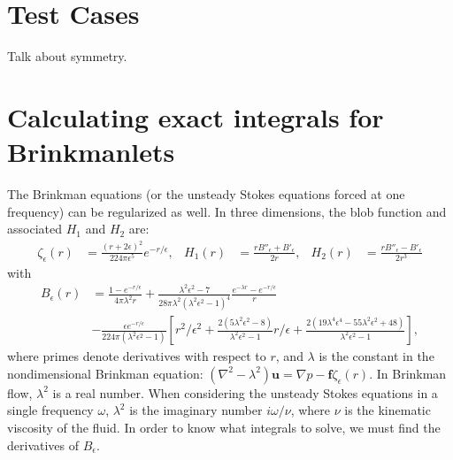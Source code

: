\documentclass[12pt]{article}
\newcommand{\bu}{\mathbf{u}}
\newcommand{\ff}{\mathbf{f}}
\newcommand{\eps}{\epsilon}
\newcommand{\baas}[1]{\begin{align*} #1 \end{align*}}
\begin{document}
	\section{Test Cases} 
	Talk about symmetry.


	\section{Calculating exact integrals for Brinkmanlets}

	The Brinkman equations (or the unsteady Stokes equations forced at one frequency) can be regularized as well. In three dimensions, the blob function and associated $H_1$ and $H_2$ are:
	\baas{
	\zeta_{\eps}(r) &= \frac{(r+2\eps)^2}{224\pi\eps^5}e^{-r/\eps}, & H_1(r) &= \frac{rB''_\eps + B'_\eps}{2r}, & H_2(r) &= \frac{rB''_\eps - B'_\eps}{2r^3} 
	}
	with
	\baas{
	B_\eps(r) &= \frac{1 - e^{-r/\eps}}{4\pi\lambda^2r} + \frac{\lambda^2\eps^2 - 7}{28\pi\lambda^2(\lambda^2\eps^2 - 1)^4}\frac{e^{-\lambda r} - e^{-r/\eps}}{r} \\
	& - \frac{\eps e^{-r/\eps}}{224\pi(\lambda^2\eps^2 -1)} \left[ r^2/\eps^2 + \frac{2(5\lambda^2\eps^2 - 8)}{\lambda^2\eps^2 - 1}r/\eps + \frac{2(19\lambda^4\eps^4 - 55\lambda^2\eps^2 + 48)}{\lambda^2\eps^2 - 1}  \right],
	}
	where primes denote derivatives with respect to $r$, and $\lambda$ is the constant in the nondimensional Brinkman equation: $(\nabla^2 - \lambda^2) \bu = \nabla p - \ff\zeta_{\eps}(r)$. In Brinkman flow, $\lambda^2$ is a real number. When considering the unsteady Stokes equations in a single frequency $\omega$, $\lambda^2$ is the imaginary number $i\omega/\nu$, where $\nu$ is the kinematic viscosity of the fluid. In order to know what integrals to solve, we must find the derivatives of $B_\eps$.

\appendix
\end{document}
